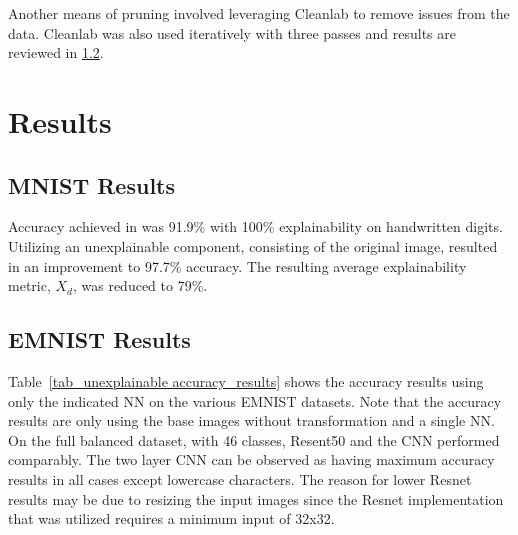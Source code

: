 \documentclass[conference]{IEEEtran}
\begin{document}
Another means of pruning involved leveraging Cleanlab to remove issues from the data.
Cleanlab was also used iteratively with three passes and results are reviewed in
\ref{emnist_results}.

\section{Results}

\subsection{MNIST Results}

Accuracy achieved in \cite{whitten21} was 91.9\% with 100\% explainability on
handwritten digits. Utilizing an unexplainable component, consisting of the
original image, resulted in an improvement to 97.7\% accuracy.  The resulting
average explainability metric, $X_d$, was reduced to 79\%.



\subsection{EMNIST Results}
\label{emnist_results}

Table~\ref{tab_unexplainable accuracy_results} shows the accuracy results using
only the indicated NN on the various EMNIST datasets.  Note that the accuracy
results are only using the base images without transformation and a single NN.
On the full balanced dataset, with 46 classes, Resent50 and the CNN performed
comparably. The two layer CNN can be observed as having maximum accuracy results
in all cases except lowercase characters.  The reason for lower Resnet results
may be due to resizing the input images since the Resnet implementation that was
utilized requires a minimum input of 32x32.  
\end{document}
